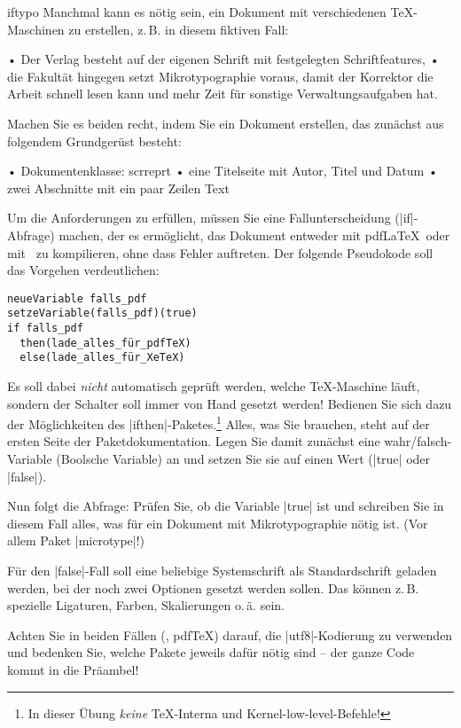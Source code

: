 \documentclass[
	draft,
	blatt=11,
	ausgabe=25.\,06.\,2010,
	rückgabe=02.\,07.\,2010
]{lcourse-hd}
\begin{document}
\begin{exercise}[
  name=Typographie auf Anfrage,
  punkte=5,
  abgabe = Quelltext per Mail{,} das fertige Dokument als Ausdruck.
]{iftypo}
Manchmal kann es nötig sein, ein Dokument mit verschiedenen \TeX-Maschinen zu erstellen, z.\,B. in diesem fiktiven Fall:

• Der Verlag besteht auf der eigenen Schrift mit festgelegten Schriftfeatures,
• die Fakultät hingegen setzt Mikrotypographie voraus, damit der Korrektor die Arbeit schnell lesen kann und mehr Zeit für sonstige Verwaltungsaufgaben hat.

Machen Sie es beiden recht, indem Sie ein Dokument erstellen, das zunächst aus folgendem Grundgerüst besteht:

• Dokumentenklasse: scrreprt
• eine Titelseite mit Autor, Titel und Datum
• zwei Abschnitte mit ein paar Zeilen Text

Um die Anforderungen zu erfüllen, müssen Sie eine Fallunterscheidung (|if|-Abfrage) machen, der es ermöglicht, das Dokument entweder mit pdf\LaTeX\ oder mit \XeLaTeX\ zu kompilieren, ohne dass Fehler auftreten. Der folgende Pseudokode soll das Vorgehen verdeutlichen:
\begin{verbatim}
neueVariable falls_pdf
setzeVariable(falls_pdf)(true)
if falls_pdf
  then(lade_alles_für_pdfTeX)
  else(lade_alles_für_XeTeX)
\end{verbatim}
Es soll dabei \emph{nicht} automatisch geprüft werden, welche \TeX-Maschine läuft, sondern der Schalter soll immer von Hand gesetzt werden! Bedienen Sie sich dazu der Möglichkeiten des |ifthen|-Paketes.\footnote{In dieser Übung \emph{keine} \TeX-Interna und Kernel-low-level-Befehle!} Alles, was Sie brauchen, steht auf der ersten Seite der Paketdokumentation. Legen Sie damit zunächst eine wahr/falsch-Variable (Boolsche Variable) an und setzen Sie sie auf einen Wert (|true| oder |false|).

Nun folgt die Abfrage: Prüfen Sie, ob die Variable |true| ist und schreiben Sie in diesem Fall alles, was für ein Dokument mit Mikrotypographie nötig ist. (Vor allem Paket |microtype|!)

Für den |false|-Fall soll eine beliebige Systemschrift als Standardschrift geladen werden, bei der noch zwei Optionen gesetzt werden sollen. Das können z.\,B. spezielle Ligaturen, Farben, Skalierungen o.\,ä. sein.

Achten Sie in beiden Fällen (\XeTeX, pdf\TeX) darauf, die |utf8|-Kodierung zu verwenden und bedenken Sie, welche Pakete jeweils dafür nötig sind – der ganze Code kommt in die Präambel!

\end{exercise}
\end{document}
